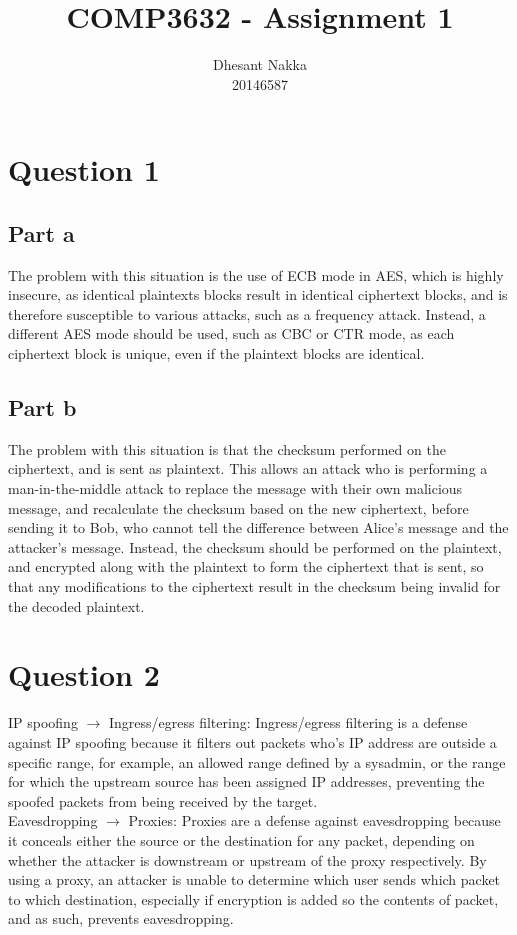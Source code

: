 \documentclass[12pt,a4paper]{article}
\title{COMP3632 - Assignment 1}
\author{Dhesant Nakka\\20146587}
\begin{document}
\maketitle

\section{Question 1}
\subsection{Part a}
The problem with this situation is the use of ECB mode in AES, which is highly insecure, as identical plaintexts blocks result in identical ciphertext blocks, and is therefore susceptible to various attacks, such as a frequency attack. Instead, a different AES mode should be used, such as CBC or CTR mode, as each ciphertext block is unique, even if the plaintext blocks are identical.

\subsection{Part b}
The problem with this situation is that the checksum performed on the ciphertext, and is sent as plaintext. This allows an attack who is performing a man-in-the-middle attack to replace the message with their own malicious message, and recalculate the checksum based on the new ciphertext, before sending it to Bob, who cannot tell the difference between Alice's message and the attacker's message. Instead, the checksum should be performed on the plaintext, and encrypted along with the plaintext to form the ciphertext that is sent, so that any modifications to the ciphertext result in the checksum being invalid for the decoded plaintext.


\section{Question 2}
IP spoofing \(\rightarrow\) Ingress/egress filtering: Ingress/egress filtering is a defense against IP spoofing because it filters out packets who's IP address are outside a specific range, for example, an allowed range defined by a sysadmin, or the range for which the upstream source has been assigned IP addresses, preventing the spoofed packets from being received by the target.\\

Eavesdropping \(\rightarrow\) Proxies: Proxies are a defense against eavesdropping because it conceals either the source or the destination for any packet, depending on whether the attacker is downstream or upstream of the proxy respectively. By using a proxy, an attacker is unable to determine which user sends which packet to which destination, especially if encryption is added so the contents of packet, and as such, prevents eavesdropping.\\
\end{document}
